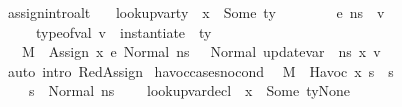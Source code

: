 \begin{isabellebody}
\endisatagproof
{\isafoldproof}%
%
\isadelimproof
\isanewline
%
\endisadelimproof
\isanewline
{}\isamarkupfalse%
\ assign{\isacharunderscore}{\kern0pt}intro{\isacharunderscore}{\kern0pt}alt{\isacharcolon}{\kern0pt}\isanewline
\ \ {\isachardoublequoteopen}{\isasymlbrakk}\ lookup{\isacharunderscore}{\kern0pt}var{\isacharunderscore}{\kern0pt}ty\ {\isasymLambda}\ x\ {\isacharequal}{\kern0pt}\ Some\ ty{\isacharsemicolon}{\kern0pt}\ \isanewline
\ \ \ \ \ {\isasymLambda}{\isacharcomma}{\kern0pt}{\isasymGamma}{\isacharcomma}{\kern0pt}{\isasymOmega}\ {\isasymturnstile}\ {\isasymlangle}e{\isacharcomma}{\kern0pt}\ n{\isacharunderscore}{\kern0pt}s{\isasymrangle}\ {\isasymDown}\ v{\isacharsemicolon}{\kern0pt}\isanewline
\ \ \ \ \ type{\isacharunderscore}{\kern0pt}of{\isacharunderscore}{\kern0pt}val\ v\ {\isacharequal}{\kern0pt}\ instantiate\ {\isasymOmega}\ ty\ \ {\isasymrbrakk}\ {\isasymLongrightarrow}\isanewline
\ \ \ M{\isacharcomma}{\kern0pt}{\isasymLambda}{\isacharcomma}{\kern0pt}{\isasymGamma}{\isacharcomma}{\kern0pt}{\isasymOmega}\ {\isasymturnstile}\ {\isasymlangle}Assign\ x\ e{\isacharcomma}{\kern0pt}\ Normal\ n{\isacharunderscore}{\kern0pt}s{\isasymrangle}\ {\isasymrightarrow}\ \ Normal\ {\isacharparenleft}{\kern0pt}update{\isacharunderscore}{\kern0pt}var\ {\isasymLambda}\ n{\isacharunderscore}{\kern0pt}s\ x\ v{\isacharparenright}{\kern0pt}{\isachardoublequoteclose}\isanewline
%
\isadelimproof
\ \ %
\endisadelimproof
%
\isatagproof
{}\isamarkupfalse%
\ {\isacharparenleft}{\kern0pt}auto\ intro{\isacharcolon}{\kern0pt}\ RedAssign{\isacharparenright}{\kern0pt}%
\endisatagproof
{\isafoldproof}%
%
\isadelimproof
\isanewline
%
\endisadelimproof
\isanewline
\isanewline
{}\isamarkupfalse%
\ havoc{\isacharunderscore}{\kern0pt}cases{\isacharunderscore}{\kern0pt}no{\isacharunderscore}{\kern0pt}cond{\isacharcolon}{\kern0pt}\isanewline
\ \ {\isachardoublequoteopen}{\isasymlbrakk}M{\isacharcomma}{\kern0pt}{\isasymLambda}{\isacharcomma}{\kern0pt}{\isasymGamma}{\isacharcomma}{\kern0pt}{\isasymOmega}\ {\isasymturnstile}\ {\isasymlangle}Havoc\ x{\isacharcomma}{\kern0pt}\ s{\isasymrangle}\ {\isasymrightarrow}\ s{\isacharprime}{\kern0pt}{\isacharsemicolon}{\kern0pt}\isanewline
\ \ \ \ s\ {\isacharequal}{\kern0pt}\ Normal\ n{\isacharunderscore}{\kern0pt}s{\isacharsemicolon}{\kern0pt}\isanewline
\ \ \ \ lookup{\isacharunderscore}{\kern0pt}var{\isacharunderscore}{\kern0pt}decl\ {\isasymLambda}\ x\ {\isacharequal}{\kern0pt}\ Some\ {\isacharparenleft}{\kern0pt}ty{\isacharcomma}{\kern0pt}None{\isacharparenright}{\kern0pt}{\isacharsemicolon}{\kern0pt}\isanewline

\end{isabellebody}
